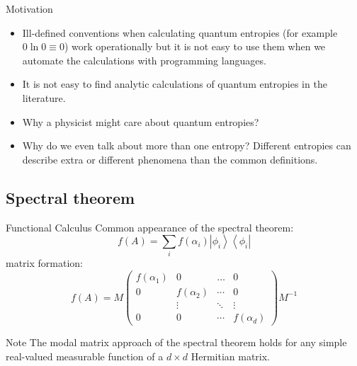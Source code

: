 \documentclass{beamer}
\begin{document}
\begin{frame}{Motivation}
\begin{scriptsize}
\begin{itemize}
\item Ill-defined conventions when calculating quantum entropies (for example $0\ln 0\equiv 0$) work operationally but it is not easy to use them when we automate the calculations with programming languages.
\item It is not easy to find analytic calculations of quantum entropies in the literature.
\item Why a physicist might care about quantum entropies? 
\begin{center}	
\end{center}
\begin{center}
\end{center}
\item Why do we even talk about more than one entropy? Different entropies can describe extra or different phenomena than the common definitions.
\end{itemize}
\end{scriptsize}
\end{frame}

\subsection{Spectral theorem}

\begin{frame}{Functional Calculus}
Common appearance of the spectral theorem:
$$
f(A)=\sum_{i} f\left(\alpha_{i}\right)\left|\phi_{i}\right\rangle\left\langle\phi_{i}\right|
$$
matrix formation:
$$
f(A)=M\left(\begin{array}{cccc}
f\left(\alpha_{1}\right) & 0 & \ldots & 0 \\
0 & f\left(\alpha_{2}\right) & \cdots & 0 \\
& \vdots  & \ddots & \vdots \\
0 & 0 & \cdots & f\left(\alpha_{d}\right)
\end{array}\right) M^{-1}
$$
\begin{alertblock}{Note}
The modal matrix approach of the spectral theorem holds for any simple real-valued measurable function of a $d \times d$  Hermitian matrix.
\end{alertblock}
\end{frame}
\end{document}
